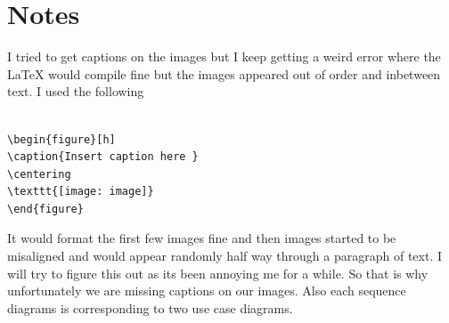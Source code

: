 \documentclass{article}
\begin{document}
\section{Notes}
I tried to get captions on the images but I keep getting a weird error where the LaTeX would compile fine but the images appeared out of order and inbetween text. I used the following 
\begin{verbatim}

\begin{figure}[h]
\caption{Insert caption here }
\centering
\texttt{[image: image]}
\end{figure}
\end{verbatim}

It would format the first few images fine and then images started to be misaligned and would appear randomly half way through a paragraph of text. I will try to figure this out as its been annoying me for a while. So that is why unfortunately we are missing captions on our images. Also each sequence diagrams is corresponding to two use case diagrams.
\end{document}
